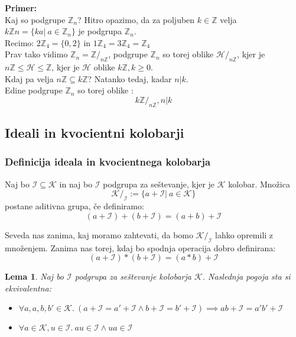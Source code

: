 \documentclass[a4paper]{article}
\newcounter{environment:definition_counter}
\newcounter{environment:theorem_counter}
\newcounter{environment:statement_counter}
\newcounter{example:example_counter}
\newenvironment{example}
{\textbf{Primer:}\\}
{\setcounter{example:example_counter}{0}}
\newtheorem{lemma}{Lema}
\begin{document}
\begin{example}
Kaj so podgrupe $\mathbb{Z}_n$? Hitro opazimo, da za poljuben $k \in \mathbb{Z}$ velja $k\mathbb{Z}n = \{ka | \ a \in \mathbb{Z}_n\}$ je podgrupa $\mathbb{Z}_n$.\\
Recimo: $2\mathbb{Z}_4 = \{0,2\}$ in $1\mathbb{Z}_4 = 3\mathbb{Z}_4 = \mathbb{Z}_4$\\
Prav tako vidimo $\mathbb{Z}_n = \mathbb{Z}/_{n\mathbb{Z}}$, podgrupe $\mathbb{Z}_n$ so torej oblike $\mathcal{H}/_{n\mathbb{Z}}$, kjer je $n\mathbb{Z} \leq \mathcal{H} \leq \mathbb{Z}$, kjer je $\mathcal{H}$ oblike $k\mathbb{Z}, k \geq 0$.\\
Kdaj pa velja $n\mathbb{Z} \subseteq k\mathbb{Z}$? Natanko tedaj, kadar $n|k$.\\
Edine podgrupe $\mathbb{Z}_n$ so torej oblike : \\
$$k\mathbb{Z}/_{n\mathbb{Z}}, n|k$$

\end{example}


\subsection{Ideali in kvocientni kolobarji}

\subsubsection{Definicija ideala in kvocientnega kolobarja}


Naj bo $\mathcal{I} \subseteq \mathcal{K}$ in naj bo $\mathcal{I}$ podgrupa za seštevanje, kjer je $\mathcal{K}$ kolobar. Množica 
$$\mathcal{K}/_{\mathcal{I}} := \{ a+\mathcal{I} | \ a \in \mathcal{K} \}$$
postane aditivna grupa, če definiramo:
$$(a+\mathcal{I}) + (b + \mathcal{I}) = (a+b) + \mathcal{I}$$

Seveda nas zanima, kaj moramo zahtevati, da bomo $\mathcal{K}/_{\mathcal{I}}$ lahko opremili z množenjem. Zanima nas torej, kdaj bo spodnja operacija dobro definirana:
$$(a+\mathcal{I}) * (b + \mathcal{I}) = (a*b) + \mathcal{I}$$

\begin{lemma}
Naj bo $\mathcal{I}$ podgrupa za seštevanje kolobarja $\mathcal{K}$. Naslednja pogoja sta si ekvivalentna:
\begin{itemize}
\item $\forall a,a,b,b' \in \mathcal{K}. \ (a+\mathcal{I} = a'+\mathcal{I} \land b+\mathcal{I} = b'+\mathcal{I}) \implies ab + \mathcal{I} = a'b'+\mathcal{I}$
\item $\forall a \in \mathcal{K}, u \in \mathcal{I}. \ au \in \mathcal{I} \land ua \in \mathcal{I}$
\end{itemize}
\end{lemma}
\end{document}
